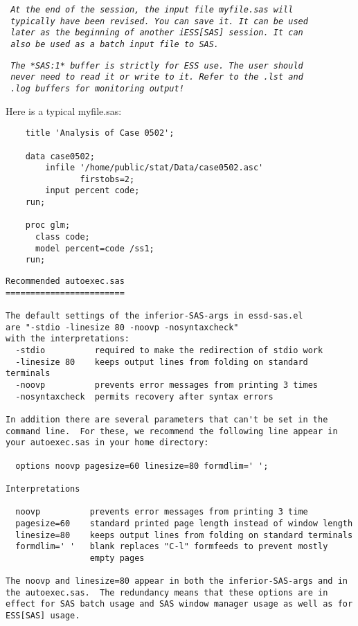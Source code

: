 \documentclass{article}
\newcommand*{\Scmt}[1]{\hbox{\qquad {\footnotesize \#\#} \textsl{#1}}}
\newenvironment{Salltt}{\small\begin{alltt}}{\end{alltt}}
\begin{document}
\begin{Salltt}
    \Scmt{At the end of the session, the input file myfile.sas will}
    \Scmt{typically have been revised.  You can save it.  It can be used}
    \Scmt{later as the beginning of another iESS[SAS] session.  It can}
    \Scmt{also be used as a batch input file to SAS.}

    \Scmt{The *SAS:1* buffer is strictly for ESS use.  The user should}
    \Scmt{never need to read it or write to it.  Refer to the .lst and}
    \Scmt{.log buffers for monitoring output!}
\end{Salltt}
Here is a typical myfile.sas:
\begin{verbatim}
    title 'Analysis of Case 0502';

    data case0502;
        infile '/home/public/stat/Data/case0502.asc'
               firstobs=2;
        input percent code;
    run;

    proc glm;
      class code;
      model percent=code /ss1;
    run;
\end{verbatim}

\begin{verbatim}
Recommended autoexec.sas
========================

The default settings of the inferior-SAS-args in essd-sas.el
are "-stdio -linesize 80 -noovp -nosyntaxcheck"
with the interpretations:
  -stdio          required to make the redirection of stdio work
  -linesize 80    keeps output lines from folding on standard terminals
  -noovp          prevents error messages from printing 3 times
  -nosyntaxcheck  permits recovery after syntax errors

In addition there are several parameters that can't be set in the
command line.  For these, we recommend the following line appear in
your autoexec.sas in your home directory:

  options noovp pagesize=60 linesize=80 formdlim=' ';

Interpretations

  noovp          prevents error messages from printing 3 time
  pagesize=60    standard printed page length instead of window length
  linesize=80    keeps output lines from folding on standard terminals
  formdlim=' '   blank replaces "C-l" formfeeds to prevent mostly
                 empty pages

The noovp and linesize=80 appear in both the inferior-SAS-args and in
the autoexec.sas.  The redundancy means that these options are in
effect for SAS batch usage and SAS window manager usage as well as for
ESS[SAS] usage.
\end{verbatim}
\end{document}
